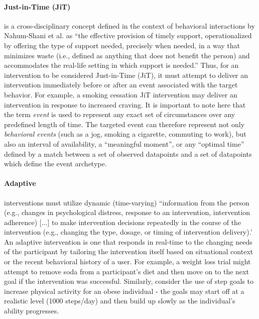 \documentclass[runningheads,a4paper]{llncs}
\begin{document}
\paragraph{Just-in-Time (JiT)} is a cross-disciplinary concept defined in the context of behavioral interactions by Nahum-Shani et al. as ``the effective provision of timely support, operationalized by offering the type of support needed, precisely when needed, in a way that minimizes waste (i.e., defined as anything that does not benefit the person) and accommodates the real-life setting in which support is needed.'' \cite{nahum2014}
Thus, for an intervention to be considered Just-in-Time (JiT), it must attempt to deliver an intervention immediately before or after an event associated with the target behavior. 
For example, a smoking cessation JiT intervention may deliver an intervention in response to increased craving.
It is important to note here that the term \emph{event} is used to represent any exact set of circumstances over any predefined length of time.
The targeted event can therefore represent not only \emph{behavioral events} (such as a jog, smoking a cigarette, commuting to work), but also an interval of availability, a ``meaningful moment'', or any ``optimal time'' defined by a match between a set of observed datapoints and a set of datapoints which define the event archetype.

\paragraph{Adaptive} interventions must utilize dynamic (time-varying) ``information from the person (e.g., changes in psychological distress, response to an intervention, intervention adherence) [...] to make intervention decisions repeatedly in the course of the intervention (e.g., changing the type, dosage, or timing of intervention delivery).' \cite{nahum2014}
An adaptive intervention is one that responds in real-time to the changing needs of the participant by tailoring the intervention itself based on situational context or the recent behavioral history of a user. 
For example, a weight loss trial might attempt to remove soda from a participant's diet and then move on to the next goal if the intervention was successful.
Similarly, consider the use of step goals to increase physical activity for an obese individual - the goals may start off at a realistic level (1000 steps/day) and then build up slowly as the individual's ability progresses.
\end{document}
